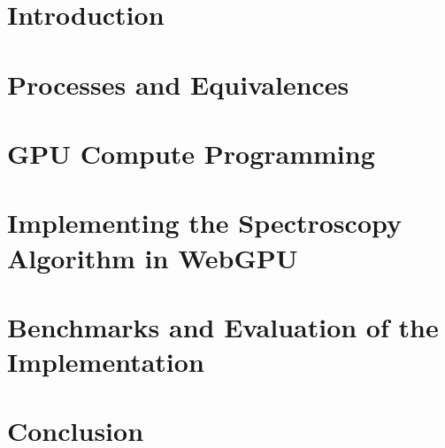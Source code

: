 \documentclass[a4paper]{report}
\theoremstyle{definition}
\begin{document}
\tableofcontents

\chapter{Introduction}


\chapter{Processes and Equivalences}\label{ch:processes}


\chapter{GPU Compute Programming}\label{ch:gpu}


\chapter{Implementing the Spectroscopy Algorithm in WebGPU}\label{ch:implementation}


\chapter{Benchmarks and Evaluation of the Implementation}\label{ch:benchmarks}


\chapter{Conclusion}


\printbibliography[heading=bibintoc]
\end{document}

